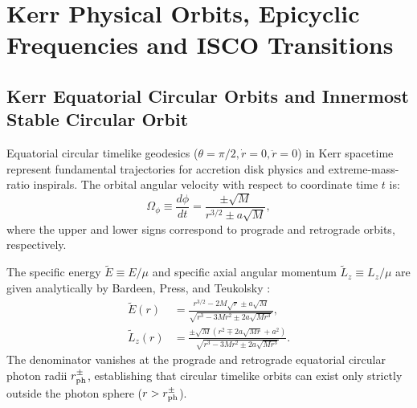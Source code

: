 \section{Kerr Physical Orbits, Epicyclic Frequencies and ISCO Transitions}
\label{sec:kerr_physical_orbits}

\subsection{Kerr Equatorial Circular Orbits and Innermost Stable Circular Orbit}
\label{subsec:kerr_equatorial_circular}
Equatorial circular timelike geodesics ($\theta = \pi/2, \dot{r} = 0, \ddot{r} = 0$) in Kerr spacetime represent fundamental trajectories for accretion disk physics and extreme-mass-ratio inspirals. The orbital angular velocity with respect to coordinate time $t$ is:
\begin{equation}
    \Omega_\phi \equiv \frac{d\phi}{dt} = \frac{\pm \sqrt{M}}{r^{3/2} \pm a\sqrt{M}},
    \label{eq:kerr_circular_omega}
\end{equation}
where the upper and lower signs correspond to prograde and retrograde orbits, respectively.

The specific energy $\tilde{E} \equiv E/\mu$ and specific axial angular momentum $\tilde{L}_z \equiv L_z/\mu$ are given analytically by Bardeen, Press, and Teukolsky \cite{BardeenPressTeukolsky1972}:
\begin{align}
    \tilde{E}(r) &= \frac{r^{3/2} - 2M\sqrt{r} \pm a\sqrt{M}}{\sqrt{r^3 - 3Mr^2 \pm 2a\sqrt{M r^3}}}, \label{eq:kerr_energy_circular} \\
    \tilde{L}_z(r) &= \frac{\pm \sqrt{M}\left(r^2 \mp 2a\sqrt{Mr} + a^2\right)}{\sqrt{r^3 - 3Mr^2 \pm 2a\sqrt{M r^3}}}. \label{eq:kerr_angmom_circular}
\end{align}
The denominator vanishes at the prograde and retrograde equatorial circular photon radii $r_{\rm ph}^\pm$, establishing that circular timelike orbits can exist only strictly outside the photon sphere ($r > r_{\rm ph}^\pm$).

